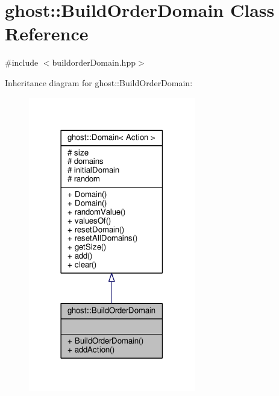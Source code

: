 \hypertarget{classghost_1_1BuildOrderDomain}{\section{ghost\-:\-:Build\-Order\-Domain Class Reference}
\label{classghost_1_1BuildOrderDomain}
}


{\ttfamily \#include $<$buildorder\-Domain.\-hpp$>$}



Inheritance diagram for ghost\-:\-:Build\-Order\-Domain\-:
\nopagebreak
\begin{figure}[H]
\begin{center}
\leavevmode
\includegraphics[width=206pt]{classghost_1_1BuildOrderDomain__inherit__graph}
\end{center}
\end{figure}


